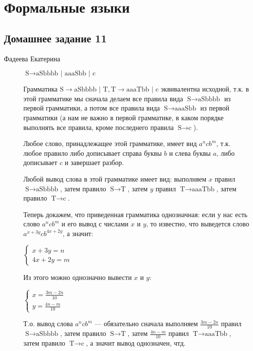 \documentclass[12pt,a4paper]{scrartcl}
\begin{document}
	\section*{Формальные языки}
	\subsection*{Домашнее задание 11}
	\begin{flushright}
		Фадеева Екатерина
	\end{flushright}

\begin{description}
	\item[]
	$\text{S} \rightarrow \text{aSbbbb | aaaSbb | c}$
	
	Грамматика $\text{S} \rightarrow \text{aSbbbb | T}, \text{T} \rightarrow \text{aaaTbb | c}$ эквивалентна исходной, т.к. в этой грамматике мы сначала делаем все правила вида $\text{S} \rightarrow \text{aSbbbb}$ из первой грамматики, а потом все правила вида $\text{S} \rightarrow \text{aaaSbb}$ из первой грамматики (а нам не важно в первой грамматике, в каком порядке выполнять все правила, кроме последнего правила $\text{S} \rightarrow \text{c}$).
	
	Любое слово, принадлежащее этой грамматике, имеет вид $a^ncb^m$, т.к. любое правило либо дописывает справа буквы $b$ и слева буквы $a$, либо дописывает $c$ и завершает разбор.
	
	Любой вывод слова в этой грамматике имеет вид: выполняем $x$ правил $\text{S} \rightarrow \text{aSbbbb}$, затем правило $\text{S} \rightarrow \text{T}$, затем $y$ правил $\text{T} \rightarrow \text{aaaTbb}$, затем правило $\text{T} \rightarrow \text{c}$.
	
	Теперь докажем, что приведенная грамматика однозначная: если у нас есть слово $a^ncb^m$ и его вывод с числами $x$ и $y$, то известно, что выведется слово $a^{x+3y}cb^{4x+2y}$, а значит:
	
	$\begin{cases}
	 x + 3y = n\\
	4x + 2y = m
	\end{cases}$
	
	Из этого можно однозначно вывести $x$ и $y$:
	
	$\begin{cases}
	x = \frac{3m - 2n}{10}\\
	y = \frac{4n - m}{10}
	\end{cases}$
	
	Т.о. вывод слова $a^ncb^m$ --- обязательно сначала выполняем $\frac{3m - 2n}{10}$ правил $\text{S} \rightarrow \text{aSbbbb}$, затем правило $\text{S} \rightarrow \text{T}$, затем $\frac{4n - m}{10}$ правил $\text{T} \rightarrow \text{aaaTbb}$, затем правило $\text{T} \rightarrow \text{c}$, а значит вывод однозначен, чтд.
	

\end{description}
\end{document}
